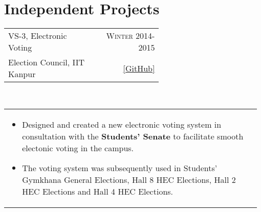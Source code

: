\documentclass[a4paper]{article} %
\newcommand{\verticalspacing}{-0.25cm}
\newcommand{\bulletspace}{0.7cm}
\newcommand{\projectheadspacing}{6.9cm}
\newcommand{\cproject}[5]{%
    \begin{tabular}{p{0.60\linewidth}r}
        \textcolor{NavyBlue}{\small #2} & \multicolumn{1}{m{ \projectheadspacing{} }}{\raggedleft \small {\textsc{#1}}}\\
        \small {#3} & \small {#4}
    \end{tabular}\\
    \begin{tabular}{p{0.98\linewidth}}
    \vspace{-0.3cm}
        \small{#5}
    \end{tabular}
    \vspace{\verticalspacing{}}
}
\begin{document}

\section{Independent Projects}

\cproject
    {Winter 2014-2015}
    {VS-3, Electronic Voting}
    {Election Council, IIT Kanpur}
    {\href{https://github.com/srijanshetty/elections} {\small{[GitHub]}}}
    {%
        \begin{itemize}[leftmargin=\bulletspace{}]
            \item Designed and created a new electronic voting system in consultation with the \textbf{Students' Senate}
                to facilitate smooth electonic voting in the campus.
            \item The voting system was subsequently used in Students'
                Gymkhana General Elections, Hall 8 HEC Elections, Hall 2 HEC Elections and Hall 4 HEC Elections.
        \end{itemize}
    }
\end{document}
